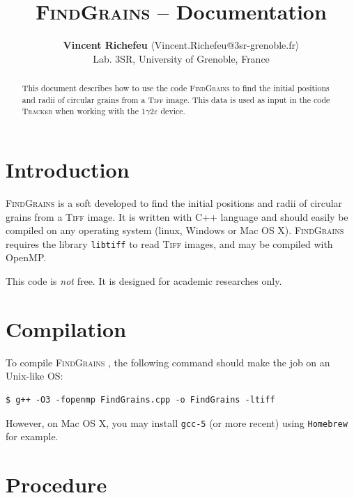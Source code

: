 \documentclass{simpledoc}
\title{\textsc{FindGrains} -- Documentation}
\author{
\textbf{Vincent Richefeu} $\langle$Vincent.Richefeu@3sr-grenoble.fr$\rangle$\\
Lab. 3SR, University of Grenoble, France
}
\newcommand{\soft}{\textsc{FindGrains} }
\newcommand{\screen}[1]{\texttt{\color{myblue}#1}}
\newcommand{\scr}[1]{\texttt{\color{myblue}#1}}
\begin{document}
\maketitle

\begin{abstract}
This document describes how to use the code \soft to find the initial positions and radii of circular grains from a \textsc{Tiff} image. This data is used as input in the code \textsc{Tracker} when working with the $1\gamma 2 \varepsilon$ device.
\end{abstract}

\tableofcontents

\newpage

\section{Introduction}

\soft is a soft developed to find the initial positions and radii of circular grains from a \textsc{Tiff} image. 
 It is written with C++ language and should easily be compiled on any operating system (linux, Windows or Mac OS X).
\soft\! requires the library \screen{libtiff} to read \textsc{Tiff} images, and may be compiled with OpenMP. 

\attention
{\color{red} This code is \textit{not} free. It is designed for academic researches only.}

\section{Compilation}

To compile \soft, the following command should make the job on an Unix-like OS:
%
\begin{verbatim}
$ g++ -O3 -fopenmp FindGrains.cpp -o FindGrains -ltiff
\end{verbatim}
%
However, on Mac OS X, you may install \scr{gcc-5} (or more recent) using \scr{Homebrew} for example. 

\section{Procedure}
\end{document}
